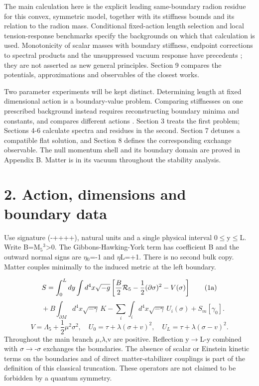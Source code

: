 \documentclass[11pt,a4paper]{article}
\begin{document}
The main calculation here is the explicit leading same-boundary radion residue for this convex, symmetric model, together with its stiffness bounds and its relation to the radion mass. Conditional fixed-action length selection and local tension-response benchmarks specify the backgrounds on which that calculation is used. Monotonicity of scalar masses with boundary stiffness, endpoint corrections to spectral products and the unsuppressed vacuum response have precedents \cite{ref2,ref6,ref9,ref23}; they are not asserted as new general principles. Section 9 compares the potentials, approximations and observables of the closest works.

Two parameter experiments will be kept distinct. Determining length at fixed dimensional action is a boundary-value problem. Comparing stiffnesses on one prescribed background instead requires reconstructing boundary minima and constants, and compares different actions \cite{ref6}. Section 3 treats the first problem; Sections 4-6 calculate spectra and residues in the second. Section 7 detunes a compatible flat solution, and Section 8 defines the corresponding exchange observable. The null momentum shell and its boundary domain are proved in Appendix B. Matter is in its vacuum throughout the stability analysis.

\section*{2. Action, dimensions and boundary data}
Use signature (-++++), natural units and a single physical interval 0\ensuremath{\leq}y\ensuremath{\leq}L. Write B=M\ensuremath{{}_{5}}\ensuremath{{}^{3}}>0. The Gibbons-Hawking-York term has coefficient B and the outward normal signs are \ensuremath{\eta}\ensuremath{{}_{0}}=-1 and \ensuremath{\eta}L=+1. There is no second bulk copy. Matter couples minimally to the induced metric at the left boundary.

\begin{equation}
S=\int_0^Ldy\int d^4x\sqrt{-g}\left[\frac{B}{2}{\cal R}_5-\frac12(\partial\sigma)^2-V(\sigma)\right]\tag{1a}
\end{equation}
\begin{equation}
\quad+B\int_{\partial M}d^4x\sqrt{-\gamma}\,K-\sum_i\int_i d^4x\sqrt{-\gamma}\,U_i(\sigma)+S_m[\gamma_0].\tag{1b}
\end{equation}
\begin{equation}
V=\Lambda_5+\frac12\mu^2\sigma^2,\quad U_0=\tau+\lambda(\sigma+v)^2,\quad U_L=\tau+\lambda(\sigma-v)^2.\tag{2}
\end{equation}
Throughout the main branch \ensuremath{\mu},\ensuremath{\lambda},v are positive. Reflection y\ensuremath{\to}L-y combined with \ensuremath{\sigma}\ensuremath{\to}-\ensuremath{\sigma} exchanges the boundaries. The absence of scalar or Einstein kinetic terms on the boundaries and of direct matter-stabilizer couplings is part of the definition of this classical truncation. These operators are not claimed to be forbidden by a quantum symmetry.
\end{document}
